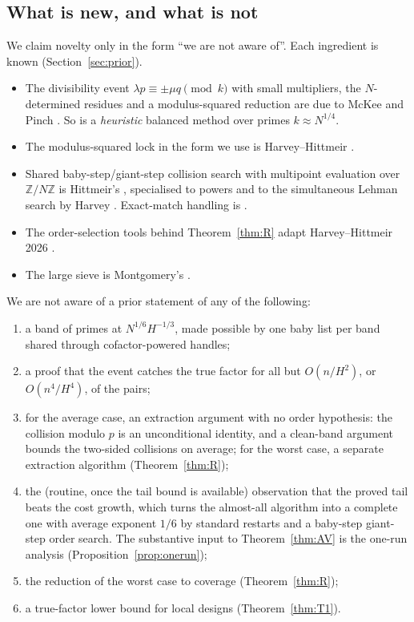 \documentclass[11pt]{amsart}
\theoremstyle{definition}
\newcommand{\Z}{\mathbb{Z}}
\begin{document}
\subsection{What is new, and what is not}
We claim novelty only in the form ``we are not aware of''. Each ingredient is known
(Section~\ref{sec:prior}).
\begin{itemize}
\item The divisibility event $\lambda p\equiv\pm\mu q\pmod k$ with small multipliers, the
  $N$-determined residues and a modulus-squared reduction are due to McKee and Pinch
  \cite[\S5]{mckeepinch1996}. So is a \emph{heuristic} balanced method over primes
  $k\approx N^{1/4}$.
\item The modulus-squared lock in the form we use is Harvey--Hittmeir
  \cite[Prop.~3.3]{hh2022}.
\item Shared baby-step/giant-step collision search with multipoint evaluation over $\Z/N\Z$ is
  Hittmeir's \cite{hittmeir2018}, specialised to powers and to the simultaneous Lehman search
  by Harvey \cite[Alg.~4.1]{harvey2021}. Exact-match handling is \cite[Alg.~4.2]{harvey2021}.
\item The order-selection tools behind Theorem~\ref{thm:R} adapt Harvey--Hittmeir 2026
  \cite{hh2026}.
\item The large sieve is Montgomery's \cite{montgomery1968,mv1973}.
\end{itemize}
We are not aware of a prior statement of any of the following:
\begin{enumerate}[label=(\roman*)]
\item a band of primes at $N^{1/6}H^{-1/3}$, made possible by one baby list per band shared
  through cofactor-powered handles;
\item a proof that the event catches the true factor for all but $O(n/H^2)$, or
  $O(n^4/H^4)$, of the pairs;
\item for the average case, an extraction argument with no order hypothesis: the collision
  modulo $p$ is an unconditional identity, and a clean-band argument bounds the two-sided
  collisions on average; for the worst case, a separate extraction algorithm
  (Theorem~\ref{thm:R});
\item the (routine, once the tail bound is available) observation that the proved tail beats the
  cost growth, which turns the almost-all algorithm into a complete one with average exponent
  $1/6$ by standard restarts and a baby-step giant-step order search. The substantive input to
  Theorem~\ref{thm:AV} is the one-run analysis (Proposition~\ref{prop:onerun});
\item the reduction of the worst case to coverage (Theorem~\ref{thm:R});
\item a true-factor lower bound for local designs (Theorem~\ref{thm:T1}).
\end{enumerate}
\end{document}
